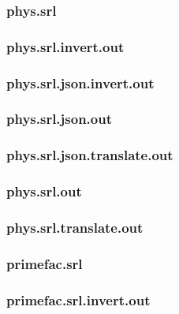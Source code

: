 \subsubsection{phys.srl}
\label{app:phys_srl}

\subsubsection{phys.srl.invert.out}
\label{app:phys_srl.invert.out}

\subsubsection{phys.srl.json.invert.out}
\label{app:phys_srl.json.invert.out}

\subsubsection{phys.srl.json.out}
\label{app:phys_srl.json.out}

\subsubsection{phys.srl.json.translate.out}
\label{app:phys_srl.json.translate.out}

\subsubsection{phys.srl.out}
\label{app:phys_srl.out}

\subsubsection{phys.srl.translate.out}
\label{app:phys_srl.translate.out}

\subsubsection{primefac.srl}
\label{app:primefac_srl}

\subsubsection{primefac.srl.invert.out}
\label{app:primefac_srl.invert.out}

